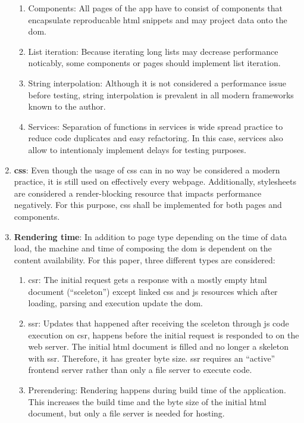 \documentclass[a4paper, fontsize=11pt]{article}
\begin{document}
\begin{enumerate}
  \begin{enumerate}
    \item Components: All pages of the app have to consist of components that encapsulate reproducable \acrshort{html} snippets and may project data onto the \acrshort{dom}.
    \item List iteration: Because iterating long lists may decrease performance noticably, some components or pages should implement list iteration.
    \item String interpolation: Although it is not considered a performance issue before testing, string interpolation is prevalent in all modern frameworks known to the author.
    \item Services: \label{enum:services} Separation of functions in services is wide spread practice to reduce code duplicates and easy refactoring.
    In this case, services also allow to intentionaly implement delays for testing purposes.
  \end{enumerate}
  
  \item \textbf{\acrshort{css}}: Even though the usage of \acrshort{css} can in no way be considered a modern practice, it is still used on effectively every webpage.
  Additionally, stylesheets are considered a render-blocking resource that impacts performance negatively. %
  For this purpose, \acrshort{css} shall be implemented for both pages and components.
  
  \item \textbf{Rendering time}: In addition to page type depending on the time of data load, the machine and time of composing the \acrshort{dom} is dependent on the content availability.
  For this paper, three different types are considered:
  \begin{enumerate}
    \item \acrfull{csr}: The initial request gets a response with a mostly empty \acrshort{html} document (\enquote{sceleton}) except linked \acrshort{css} and \acrshort{js} resources which after loading, parsing and execution update the \acrshort{dom}.
    \item \acrfull{ssr}: Updates that happened after receiving the sceleton through \acrshort{js} code execution on \acrshort{csr}, happens before the initial request is responded to on the web server.
    The initial \acrshort{html} document is filled and no longer a skeleton with \acrshort{ssr}.
    Therefore, it has greater byte size.
    \acrlong{ssr} requires an \enquote{active} frontend server rather than only a file server to execute code.
    \item Prerendering: Rendering happens during build time of the application.
    This increases the build time and the byte size of the initial \acrshort{html} document, but only a file server is needed for hosting.
  \end{enumerate}


\end{enumerate}
\end{document}
